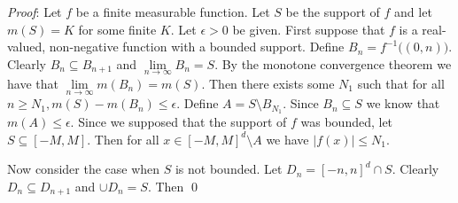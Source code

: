 \documentclass[12pt]{article}
\renewenvironment{proof}{\hspace{-4 ex} \emph{Proof}:}{\qed}
\begin{document}
	\begin{proof}
		Let $f$ be a finite measurable function. Let $S$ be the support of $f$ and let $m(S) = K$ for some finite $K$. Let $\epsilon > 0$ be given.\bigbreak
		First suppose that $f$ is a real-valued, non-negative function with a bounded support.  Define $B_n = f^{-1}\Big( (0,n) \Big)$. Clearly $B_n \subseteq B_{n+1}$ and $\lim\limits_{n \to \infty} B_n = S$. By the monotone convergence theorem we have that $\lim\limits_{n \to \infty} m(B_n) = m(S)$. Then there exists some $N_1$ such that for all $n \geq N_1, m(S) - m(B_n) \leq \epsilon$. Define $A = S \setminus B_{N_1}$. Since $B_n \subseteq S$ we know that $m(A) \leq \epsilon$. Since we supposed that the support of $f$ was bounded, let $S \subseteq [-M,M]$. Then for all $x\in[-M,M]^d\setminus A$ we have $ \vert f(x) \vert \leq N_1$.\bigbreak
		
		Now consider the case when $S$ is not bounded. Let $D_n = [-n,n]^d \cap S$. Clearly $D_n \subseteq D_{n+1}$ and $\cup D_n = S$. Then 
	\end{proof}
\end{document}
